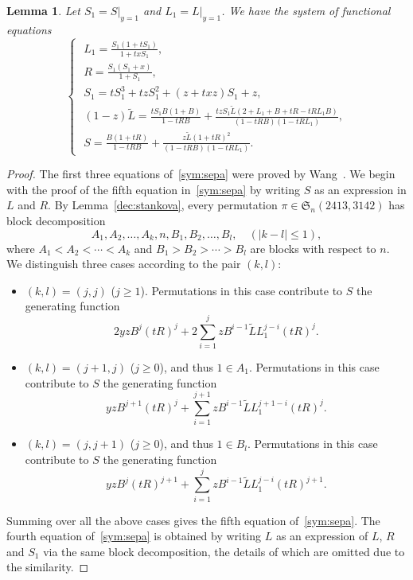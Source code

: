 \documentclass[12pt]{amsart}
\numberwithin{equation}{section}
\theoremstyle{plain}
\newtheorem{lemma}[theorem]{Lemma}
\theoremstyle{definition}
\def\S{\mathfrak{S}}
\begin{document}
\begin{lemma}
Let $S_1=S|_{y=1}$ and $L_1=L|_{y=1}$. We have the system of functional equations
\begin{equation}\label{sym:sepa}
\begin{cases}
\,\, L_1=\frac{S_1(1+tS_1)}{1+txS_1},\\
\,\,  R=\frac{S_1(S_1+x)}{1+S_1},\\
\,\, S_1=tS_1^3+tzS_1^2+(z+txz)S_1+z,\\
\,\, (1-z)\tilde L=\frac{tS_1B(1+B)}{1-tRB}+\frac{tzS_1\tilde L(2+L_1+B+tR-tRL_1B)}{(1-tRB)(1-tRL_1)},\\
\,\, S=\frac{B(1+tR)}{1-tRB}+\frac{z\tilde{L}(1+tR)^2}{(1-tRB)(1-tRL_1)}.
\end{cases}
\end{equation}
\end{lemma}
\begin{proof}
The first three equations of~\eqref{sym:sepa}  were proved by Wang~\cite{wan}. We begin with the proof of the fifth  equation in~\eqref{sym:sepa} by writing $S$ as an expression in $L$ and $R$. By Lemma~\ref{dec:stankova}, every  permutation $\pi\in\S_n(2413,3142)$  has block decomposition
$$
A_1, A_2, \ldots, A_k,n, B_1, B_2,\ldots, B_l,\quad (|k-l|\leq1),
$$
 where $A_1<A_2<\cdots<A_k$ and $B_1>B_2>\cdots >B_l$ are blocks with respect to $n$. 
 We distinguish three cases according to the pair $(k,l)$:
 \begin{itemize}
 \item[1)] $(k,l)=(j,j)$ ($j\geq1$). Permutations in this case contribute to $S$ the generating function 
 $$
 2yzB^j(tR)^j+2\sum_{i=1}^jzB^{i-1}\tilde L L_1^{j-i}(tR)^j.
 $$

 \item[2)] $(k,l)=(j+1,j)$ ($j\geq0$), and thus $1\in A_1$. Permutations in this case contribute to $S$ the generating function 
 $$
 yzB^{j+1}(tR)^j+\sum_{i=1}^{j+1}zB^{i-1}\tilde L L_1^{j+1-i}(tR)^j.
 $$

 \item[3)] $(k,l)=(j,j+1)$ ($j\geq0$), and thus $1\in B_l$.
 Permutations in this case contribute to $S$ the generating function 
 $$
 yzB^{j}(tR)^{j+1}+\sum_{i=1}^{j}zB^{i-1}\tilde L L_1^{j-i}(tR)^{j+1}.
 $$
 \end{itemize}

 
 
 
 
 
 
 
 
 
 
 
 
 
 
 
 

 
 
 Summing over all the above cases gives the fifth equation of~\eqref{sym:sepa}. The fourth equation of~\eqref{sym:sepa} is obtained by writing $L$ as an expression of $L$, $R$ and $S_1$ via the same block decomposition, the details of which are omitted due to the similarity. 
\end{proof}
\end{document}
